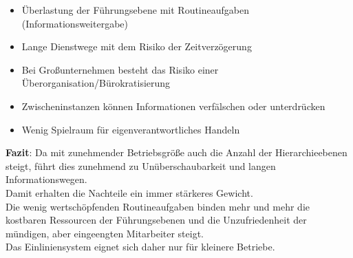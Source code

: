 \documentclass[asp1.tex]{subfiles}
\begin{document}
\begin{itemize}
    \item Überlastung der Führungsebene mit Routineaufgaben (Informationsweitergabe)
    \item Lange Dienstwege mit dem Risiko der Zeitverzögerung
    \item Bei Großunternehmen besteht das Risiko einer Überorganisation/Bürokratisierung
    \item Zwischeninstanzen können Informationen verfälschen oder unterdrücken
    \item Wenig Spielraum für eigenverantwortliches Handeln
\end{itemize}
\textbf{Fazit}:
Da mit zunehmender Betriebsgröße auch die Anzahl der Hierarchieebenen steigt, führt dies zunehmend zu Unüberschaubarkeit und langen Informationswegen. \\
Damit erhalten die Nachteile ein immer stärkeres Gewicht. \\
Die wenig wertschöpfenden Routineaufgaben binden mehr und mehr die kostbaren Ressourcen der Führungsebenen und die Unzufriedenheit der mündigen, aber eingeengten Mitarbeiter steigt. \\
Das Einliniensystem eignet sich daher nur für kleinere Betriebe.
\end{document}
